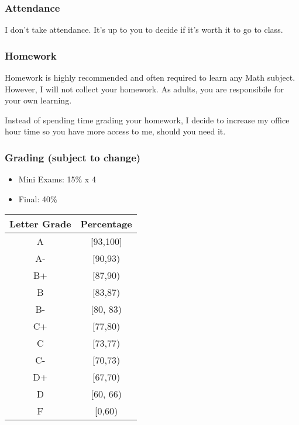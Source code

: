 \documentclass[
]{article}
\providecommand{\tightlist}{%
  \setlength{\itemsep}{0pt}\setlength{\parskip}{0pt}}
\begin{document}
\subsubsection*{Attendance}\label{attendance}

I don't take attendance. It's up to you to decide if it's worth it to go to
class.

\subsubsection*{Homework}\label{homework}

Homework is highly recommended and often required to learn any Math
subject. However, I will not collect your homework.
As adults, you are responsibile for your own learning.

Instead of spending time grading your homework, I decide to
increase my office hour time so you have more access to me,
should you need it.

\subsubsection*{Grading (subject to change)}\label{grading-subject-to-change}

\begin{itemize}
\tightlist
\item
  Mini Exams: 15\% x 4
\item
  Final: 40\%
\end{itemize}

\begin{longtable}[]{@{}cc@{}}
\toprule\noalign{}
\textbf{Letter Grade} & \textbf{Percentage} \\
\midrule\noalign{}
\endhead
\bottomrule\noalign{}
\endlastfoot
A & {[}93,100{]} \\
A- & {[}90,93) \\
B+ & {[}87,90) \\
B & {[}83,87) \\
B- & {[}80, 83) \\
C+ & {[}77,80) \\
C & {[}73,77) \\
C- & {[}70,73) \\
D+ & {[}67,70) \\
D & {[}60, 66) \\
F & {[}0,60) \\
\end{longtable}
\end{document}

